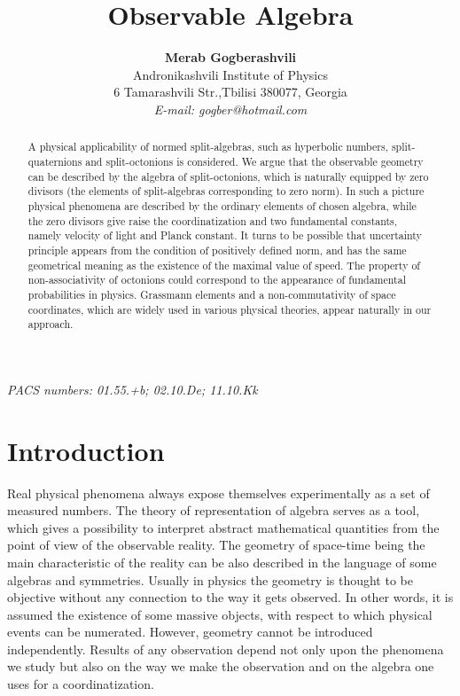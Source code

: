 \documentclass[a4paper,12pt]{article}
\begin{document}
\title{\huge \bf Observable Algebra}
\author{{\bf Merab Gogberashvili} \\
Andronikashvili Institute of Physics \\
6 Tamarashvili Str.,Tbilisi 380077, Georgia \\
{\sl E-mail: gogber@hotmail.com }}
\maketitle
\begin{abstract}
A physical applicability of normed split-algebras, such as hyperbolic numbers, 
split-quaternions and split-octonions is considered. We argue that the observable 
geometry can be described by the algebra of split-octonions, which is naturally 
equipped by zero divisors (the elements of split-algebras corresponding to zero 
norm). In such a picture physical phenomena are described by the ordinary elements 
of chosen algebra, while the zero divisors give raise the coordinatization and 
two fundamental constants, namely velocity of light and Planck constant. It turns 
to be possible that uncertainty principle appears from the condition of positively 
defined norm, and has the same geometrical meaning as the existence of the maximal 
value of speed. The property of non-associativity of octonions could correspond to 
the appearance of fundamental probabilities in physics. Grassmann elements and a 
non-commutativity of space coordinates, which are widely used in various physical 
theories, appear naturally in our approach. 
\end{abstract}
\vskip 0.3cm 
{\sl PACS numbers: 01.55.+b; 02.10.De; 11.10.Kk}
\vskip 0.5cm

\section{Introduction}

Real physical phenomena always expose themselves experimentally as a set of 
measured numbers. The theory of representation of algebra serves as a tool, which 
gives a possibility to interpret abstract mathematical quantities from the point of 
view of the observable reality. The geometry of space-time being the main 
characteristic of the reality can be also described in the language of some 
algebras and symmetries. Usually in physics the geometry is thought to be 
objective without any connection to the way it gets observed. In other words, 
it is assumed the existence of some massive objects, with respect to which 
physical events can be numerated. However, geometry cannot be introduced 
independently. Results of any observation depend not only upon the phenomena 
we study but also on the way we make the observation and on the algebra one 
uses for a coordinatization. 
\end{document}
